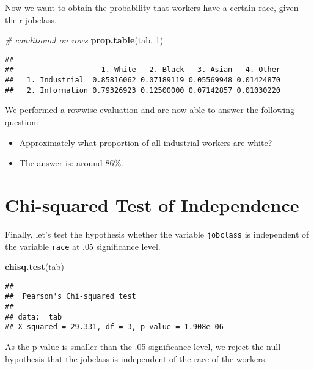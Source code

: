 \documentclass[
]{book}
\newenvironment{Shaded}{\begin{snugshade}}{\end{snugshade}}
\newcommand{\CommentTok}[1]{\textcolor[rgb]{0.56,0.35,0.01}{\textit{#1}}}
\newcommand{\DecValTok}[1]{\textcolor[rgb]{0.00,0.00,0.81}{#1}}
\newcommand{\KeywordTok}[1]{\textcolor[rgb]{0.13,0.29,0.53}{\textbf{#1}}}
\newcommand{\NormalTok}[1]{#1}
\providecommand{\tightlist}{%
  \setlength{\itemsep}{0pt}\setlength{\parskip}{0pt}}
\begin{document}
Now we want to obtain the probability that workers have a certain race, given their jobclass.

\begin{Shaded}
\begin{Highlighting}[]
\CommentTok{\# conditional on rows}
\KeywordTok{prop.table}\NormalTok{(tab, }\DecValTok{1}\NormalTok{)  }
\end{Highlighting}
\end{Shaded}

\begin{verbatim}
##                 
##                    1. White   2. Black   3. Asian   4. Other
##   1. Industrial  0.85816062 0.07189119 0.05569948 0.01424870
##   2. Information 0.79326923 0.12500000 0.07142857 0.01030220
\end{verbatim}

We performed a rowwise evaluation and are now able to answer the following question:

\begin{itemize}
\tightlist
\item
  Approximately what proportion of all industrial workers are white?
\item
  The answer is: around 86\%.
\end{itemize}

\hypertarget{chi-squared-test-of-independence}{%
\section{Chi-squared Test of Independence}\label{chi-squared-test-of-independence}}

Finally, let's test the hypothesis whether the variable \texttt{jobclass} is independent of the variable \texttt{race} at .05 significance level.

\begin{Shaded}
\begin{Highlighting}[]
\KeywordTok{chisq.test}\NormalTok{(tab)  }
\end{Highlighting}
\end{Shaded}

\begin{verbatim}
## 
##  Pearson's Chi-squared test
## 
## data:  tab
## X-squared = 29.331, df = 3, p-value = 1.908e-06
\end{verbatim}

As the p-value is smaller than the .05 significance level, we reject the null hypothesis that the jobclass is independent of the race of the workers.
\end{document}
